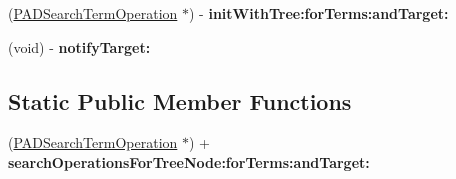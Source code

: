 \begin{DoxyCompactItemize}
\item 
\hypertarget{interface_p_a_d_search_term_operation_a789c90b132fa97f7ebf98b3736390d4d}{
(\hyperlink{interface_p_a_d_search_term_operation}{PADSearchTermOperation} $\ast$) -\/ {\bfseries initWithTree:forTerms:andTarget:}}
\label{interface_p_a_d_search_term_operation_a789c90b132fa97f7ebf98b3736390d4d}

\item 
\hypertarget{interface_p_a_d_search_term_operation_ac1c97e73b13a8819885928aba2ddafc5}{
(void) -\/ {\bfseries notifyTarget:}}
\label{interface_p_a_d_search_term_operation_ac1c97e73b13a8819885928aba2ddafc5}

\end{DoxyCompactItemize}
\subsection*{Static Public Member Functions}
\begin{DoxyCompactItemize}
\item 
\hypertarget{interface_p_a_d_search_term_operation_aee4a73f1d055220e68d6548355741e84}{
(\hyperlink{interface_p_a_d_search_term_operation}{PADSearchTermOperation} $\ast$) + {\bfseries searchOperationsForTreeNode:forTerms:andTarget:}}
\label{interface_p_a_d_search_term_operation_aee4a73f1d055220e68d6548355741e84}

\end{DoxyCompactItemize}
